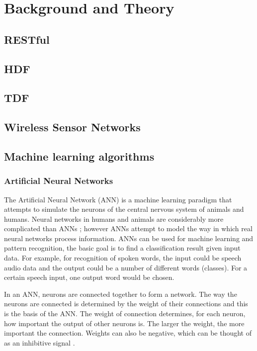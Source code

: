 \chapter{Background and Theory}

\section{RESTful}
\section{HDF}
\section{TDF}
\section{Wireless Sensor Networks}
\section{Machine learning algorithms}
\subsection{Artificial Neural Networks}
\label{ANNAppendix}

The Artificial Neural Network (ANN) is a machine learning paradigm that attempts to simulate the neurons of the central nervous system of animals and humans. Neural networks in humans and animals are considerably more complicated than ANNs \cite{Graupe2013}; however ANNs attempt to model the way in which real neural networks process information. ANNs can be used for machine learning and pattern recognition, the basic goal is to find a classification result given input data. For example, for recognition of spoken words, the input could be speech audio data and the output could be a number of different words (classes). For a certain speech input, one output word would be chosen. 

In an ANN, neurons are connected together to form a network. The way the neurons are connected is determined by the weight of their connections and this is the basis of the ANN. The weight of connection determines, for each neuron, how important the output of other neurons is. The larger the weight, the more important the connection. Weights can also be negative, which can be thought of as an inhibitive signal \cite{Graupe2013}.

